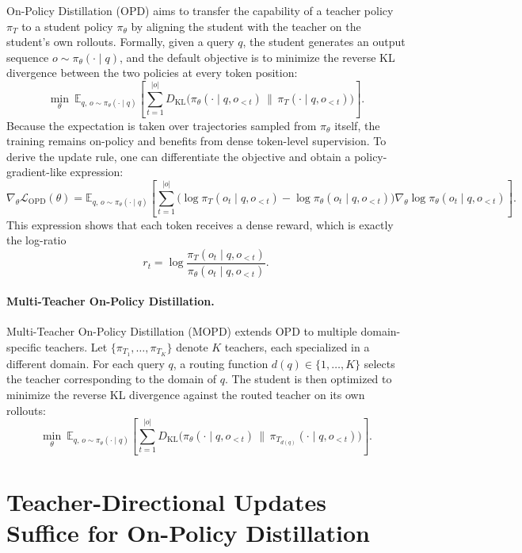 \documentclass{article}
\theoremstyle{remark}
\begin{document}
On-Policy Distillation (OPD) aims to transfer the capability of a teacher policy \(\pi_T\) to a student policy \(\pi_\theta\) by aligning the student with the teacher on the student's own rollouts. Formally, given a query \(q\), the student generates an output sequence \(o \sim \pi_\theta(\cdot \mid q)\), and the default objective is to minimize the reverse KL divergence between the two policies at every token position:
\[
\min_{\theta} \ \mathbb{E}_{q, \, o \sim \pi_\theta(\cdot \mid q)} \left[ \sum_{t=1}^{|o|} D_{\mathrm{KL}}\big( \pi_\theta(\cdot \mid q, o_{<t}) \,\big\|\, \pi_T(\cdot \mid q, o_{<t}) \big) \right].
\]
Because the expectation is taken over trajectories sampled from \(\pi_\theta\) itself, the training remains on-policy and benefits from dense token-level supervision. To derive the update rule, one can differentiate the objective and obtain a policy-gradient-like expression:
\[
\nabla_\theta \mathcal{L}_{\text{OPD}}(\theta)
=
\mathbb{E}_{q, \, o \sim \pi_\theta(\cdot \mid q)}
\left[
\sum_{t=1}^{|o|}
\Big( \log \pi_T(o_t \mid q, o_{<t}) - \log \pi_\theta(o_t \mid q, o_{<t}) \Big)
\nabla_\theta \log \pi_\theta(o_t \mid q, o_{<t})
\right].
\]
This expression shows that each token receives a dense reward, which is exactly the log-ratio
\[
r_t = \log \frac{\pi_T(o_t \mid q, o_{<t})}{\pi_\theta(o_t \mid q, o_{<t})}.
\]




\paragraph{Multi-Teacher On-Policy Distillation.}
Multi-Teacher On-Policy Distillation (MOPD) extends OPD to multiple domain-specific teachers. Let \(\{\pi_{T_1}, \dots, \pi_{T_K}\}\) denote \(K\) teachers, each specialized in a different domain. For each query \(q\), a routing function \(d(q) \in \{1,\dots,K\}\) selects the teacher corresponding to the domain of \(q\). The student is then optimized to minimize the reverse KL divergence against the routed teacher on its own rollouts:
\[
\min_{\theta} \ \mathbb{E}_{q, \, o \sim \pi_\theta(\cdot \mid q)} \left[ \sum_{t=1}^{|o|} D_{\mathrm{KL}}\big( \pi_\theta(\cdot \mid q, o_{<t}) \,\big\|\, \pi_{T_{d(q)}}(\cdot \mid q, o_{<t}) \big) \right].
\]






\section{Teacher-Directional Updates Suffice for On-Policy Distillation}
\label{sec:BinaryOPD}
\end{document}
